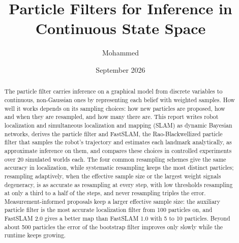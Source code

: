 \documentclass[11pt,a4paper]{article}
\title{Particle Filters for Inference in Continuous State Space}
\author{Mohammed}
\date{September 2026}
\begin{document}
\maketitle

\begin{abstract}
The particle filter carries inference on a graphical model from discrete variables to continuous, non-Gaussian
ones by representing each belief with weighted samples. How well it works depends on its sampling choices: how
new particles are proposed, how and when they are resampled, and how many there are. This report writes robot
localization and simultaneous localization and mapping (SLAM) as dynamic Bayesian networks, derives the particle
filter and FastSLAM, the Rao-Blackwellized particle filter that samples the robot's trajectory and estimates each
landmark analytically, as approximate inference on them, and compares these choices in controlled experiments
over 20 simulated worlds each. The four common resampling schemes give the same accuracy in localization, while
systematic resampling keeps the most distinct particles; resampling adaptively, when the effective sample size
or the largest weight signals degeneracy, is as accurate as resampling at every step, with low thresholds resampling at
only a third to a half of the steps, and never resampling triples the error. Measurement-informed proposals keep a larger effective sample
size: the auxiliary particle filter is the most accurate localization filter from 100 particles on, and
FastSLAM 2.0 gives a better map than FastSLAM 1.0 with 5 to 10 particles. Beyond about 500 particles the error
of the bootstrap filter improves only slowly while the runtime keeps growing.
\end{abstract}









\appendix


{\sloppy\printbibliography}
\end{document}
